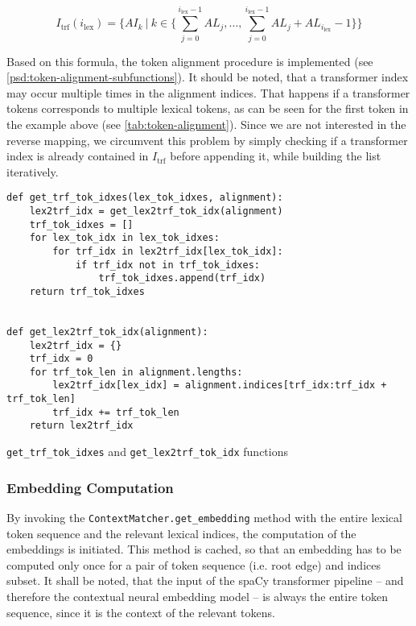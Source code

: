 \documentclass[11pt]{scrreprt}
\begin{document}
{\[I_{\text{trf}}(i_\text{lex}) = \{AI_k\ |\ k \in \{\sum_{j = 0}^{i_{\text{lex}} - 1} AL_j, ..., \sum_{j = 0}^{i_{\text{lex}} - 1} AL_j + AL_{i_{\text{lex}}} - 1 \}\}\]

Based on this formula, the token alignment procedure is implemented (see \cref{psd:token-alignment-subfunctions}). It should be noted, that a transformer index may occur multiple times in the alignment indices. That happens if a transformer tokens corresponds to multiple lexical tokens, as can be seen for the first token in the example above (see \cref{tab:token-alignment}). Since we are not interested in the reverse mapping, we circumvent this problem by simply checking if a transformer index is already contained in \(I_\text{trf}\) before appending it, while building the list iteratively.

\begin{pseudo}[htp]
\begin{lstlisting}
def get_trf_tok_idxes(lex_tok_idxes, alignment):
    lex2trf_idx = get_lex2trf_tok_idx(alignment)
    trf_tok_idxes = []
    for lex_tok_idx in lex_tok_idxes:
        for trf_idx in lex2trf_idx[lex_tok_idx]:
            if trf_idx not in trf_tok_idxes:
                trf_tok_idxes.append(trf_idx)
    return trf_tok_idxes


def get_lex2trf_tok_idx(alignment):
    lex2trf_idx = {}
    trf_idx = 0
    for trf_tok_len in alignment.lengths:
        lex2trf_idx[lex_idx] = alignment.indices[trf_idx:trf_idx + trf_tok_len]
        trf_idx += trf_tok_len
    return lex2trf_idx
\end{lstlisting}
\caption{\texttt{get\_trf\_tok\_idxes} and \texttt{get\_lex2trf\_tok\_idx} functions}
\label{psd:token-alignment-subfunctions}
\end{pseudo}


\subsubsection{Embedding Computation}
By invoking the \texttt{ContextMatcher.get\_embedding} method with the entire lexical token sequence and the relevant lexical indices, the computation of the embeddings is initiated. This method is cached, so that an embedding has to be computed only once for a pair of token sequence (i.e. root edge) and indices subset.
It shall be noted, that the input of the spaCy transformer pipeline -- and therefore the contextual neural embedding model -- is always the entire token sequence, since it is the context of the relevant tokens. 

}
\end{document}
